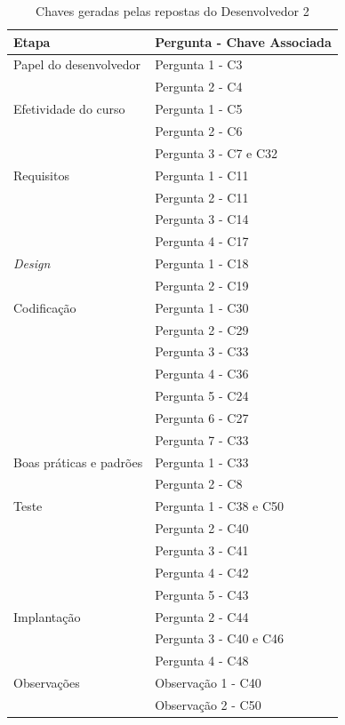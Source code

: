 \begin{table}[h]
	\centering
	\begin{tabular}{|m{4.8cm} | m{4.8cm} |}
		\hline
		\textbf{Etapa} & \textbf{Pergunta - Chave Associada} \\ \hline
		Papel do desenvolvedor & Pergunta 1 - C3 \\ \cline{2-2}
		& Pergunta 2 - C4 \\ \cline{2-2}
		\hline
		Efetividade do curso & Pergunta 1 - C5 \\ \cline{2-2}
		& Pergunta 2 - C6 \\ \cline{2-2}
		& Pergunta 3 - C7 e C32 \\ \cline{2-2}
		\hline
		Requisitos & Pergunta 1 - C11 \\ \cline{2-2}
		 & Pergunta 2 - C11 \\ \cline{2-2}
		& Pergunta 3 - C14 \\ \cline{2-2}
		& Pergunta 4 - C17 \\ \cline{2-2}
		\hline
		\textit{Design} & Pergunta 1 - C18 \\ \cline{2-2}
		& Pergunta 2 - C19 \\ \cline{2-2}
		\hline
		Codificação & Pergunta 1 - C30 \\ \cline{2-2}
		& Pergunta 2 - C29 \\ \cline{2-2}
		& Pergunta 3 - C33 \\ \cline{2-2}
		& Pergunta 4 - C36 \\ \cline{2-2}
		& Pergunta 5 - C24 \\ \cline{2-2}
		& Pergunta 6 - C27 \\ \cline{2-2}
		& Pergunta 7 - C33 \\ \cline{2-2} \hline
		Boas práticas e padrões & Pergunta 1 - C33 \\ \cline{2-2}
		& Pergunta 2 - C8\\ \cline{2-2}
		\hline
		Teste & Pergunta 1 - C38 e C50 \\ \cline{2-2}
		& Pergunta 2 - C40 \\ \cline{2-2}
		& Pergunta 3 - C41 \\ \cline{2-2}
		& Pergunta 4 - C42 \\ \cline{2-2}
		& Pergunta 5 - C43 \\ \cline{2-2}
		\hline
		Implantação & Pergunta 2 - C44 \\ \cline{2-2}
		& Pergunta 3 - C40 e C46 \\ \cline{2-2}
		& Pergunta 4 - C48 \\ \cline{2-2}
		\hline
		Observações & Observação 1 - C40 \\ \cline{2-2}  
		& Observação 2 - C50 \\
		\hline
	\end{tabular}

	\caption{Chaves geradas pelas repostas do Desenvolvedor 2}
	\label{tab04}
\end{table}

